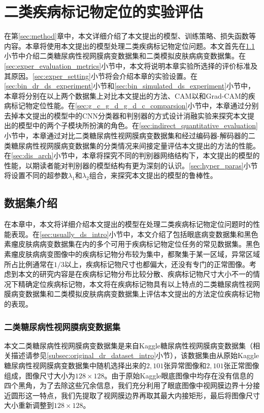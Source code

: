 \chapter{二类疾病标记物定位的实验评估}\label{sec:experiments}
在第\ref{sec:method}章中，本文详细介绍了本文提出的模型、训练策略、损失函数等内容。本章将使用本文提出的模型处理二类疾病标记物定位问题。本文首先在\ref{sec:exper_ds_intro}小节中介绍二类糖尿病性视网膜病变数据集和二类模拟皮肤病病变数据集。在\ref{sec:exper_evaluation_metrics}小节中，本文将说明本章实验所选择的评价标准及其原因。\ref{sec:exper_setting}小节将会介绍本章的实验设置。在\ref{sec:bin_dr_ds_experiment}小节和\ref{sec:bin_simulated_ds_experiment}小节中，本章将分别在以上两个数据集上对比本文提出的方法、CAM以和Grad-CAM的疾病标记物定位性能。在\ref{sec:g_c_g_d_g_d_c_comparsion}小节中，本章通过分别去掉本文提出的模型中的CNN分类器和判别器的方式设计消融实验来探究本文提出的模型中的两个子模块所扮演的角色。在\ref{sec:indirect_quantitative_evaluation}小节中，本章通过对比二类糖尿病性视网膜病变数据集和经过编码器-解码器的二类糖尿病性视网膜病变数据集的分类情况来间接定量评估本文提出的方法的性能。在\ref{sec:dis_arch}小节中，本章将探究不同的判别器网络结构下，本文提出的模型的性能，以期读者能对判别器的模型结构有更为深刻的认识。\ref{sec:hyper_paras}小节将设置不同的超参数$\lambda_{1}$和$\lambda_{2}$组合，来探究本文提出的模型的鲁棒性。
\section{数据集介绍}\label{sec:exper_ds_intro}
在本章中，本文将详细介绍本文提出的模型在处理二类疾病标记物定位问题时的性能表现。在\ref{sec:usually_ds_intro}小节中，本文介绍了包括眼底病变数据集和黑色素瘤皮肤病病变数据集在内的多个可用于疾病标记物定位任务的常见数据集。黑色素瘤皮肤病病变图像中的疾病标记物分布较为集中，都聚集于某一区域，异常区域所占比例通常在$1/3$以上，疾病标记物尺寸也都偏大，还没有专门的正常图像。考虑到本文的研究内容是在疾病标记物分布比较分散、疾病标记物尺寸大小不一的情况下精确定位疾病标记物，本文将在疾病标记物具有以上特点的二类糖尿病性视网膜病变数据集和二类模拟皮肤病病变数据集上评估本文提出的方法定位疾病标记物的表现。
\subsection{二类糖尿病性视网膜病变数据集}\label{subsec:bin_dr_ds}
本文二类糖尿病性视网膜病变数据集是来自Kaggle糖尿病性视网膜病变数据集（相关描述请参见\ref{subsec:original_dr_dataset_intro}小节），该数据集由从原始Kaggle糖尿病性视网膜病变数据集中随机选择出来的$2,101$张异常图像和$2,101$张正常图像组成，图像尺寸大小为$128\times 128$。由于原始Kaggle眼底图像中均存在没有信息的四个黑角，为了去除这些冗余信息，我们充分利用了眼底图像中视网膜边界十分接近圆形这一特点，我们先提取了视网膜边界再取其最大内接矩形，最后将图像尺寸大小重新调整到$128\times128$。

